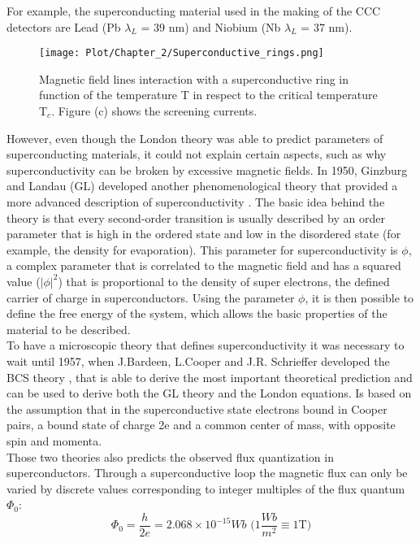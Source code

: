 \documentclass[12pt,a4paper]{report}
\begin{document}
    For example, the superconducting material used in the making of the CCC detectors are Lead (Pb $\lambda_L$ = 39 nm) and Niobium (Nb $\lambda_L$ = 37 nm).\\
    	\begin{figure} [H]
    	\centering
    	\texttt{[image: Plot/Chapter\_2/Superconductive\_rings.png]}
    	\caption{\small{Magnetic field lines interaction with a superconductive ring in function of the temperature T in respect to the critical temperature T$_c$. Figure (c) shows the screening currents.}}
    	\label{SC_rings}
    \end{figure}
    However, even though the London theory was able to predict parameters of superconducting materials, it could not explain certain aspects, such as why superconductivity can be broken by excessive magnetic fields. In 1950, Ginzburg and Landau (GL) developed another phenomenological theory that provided a more advanced description of superconductivity \cite{GL_theory}. The basic idea behind the theory is that every second-order transition is usually described by an order parameter that is high in the ordered state and low in the disordered state (for example, the density for evaporation). This parameter for superconductivity is $\phi$, a complex parameter that is correlated to the magnetic field and has a squared value ($|\phi|^2$) that is proportional to the density of super electrons, the defined carrier of charge in superconductors. Using the parameter $\phi$, it is then possible to define the free energy of the system, which allows the basic properties of the material to be described.\\
    To have a microscopic theory that defines superconductivity it was necessary to wait until 1957, when J.Bardeen, L.Cooper and J.R. Schrieffer developed the BCS theory \cite{BCS_theory}, that is able to derive the most important theoretical prediction and can be used to derive both the GL theory and the London equations. Is based on the assumption that in the superconductive state electrons bound in Cooper pairs, a bound state of charge 2e and a common center of mass, with opposite spin and momenta.\\
    Those two theories also predicts the observed flux quantization in superconductors. Through a superconductive loop the magnetic flux can only be varied by discrete values corresponding to integer multiples of the flux quantum $\Phi_0$:
    \begin{equation}
    	\Phi_0 = \frac{h}{2e} = 2.068 \times 10^{-15} Wb\text{  (}1\frac{Wb}{m^2} \equiv 1 \text{T)}
    \end{equation}
    
\end{document}
